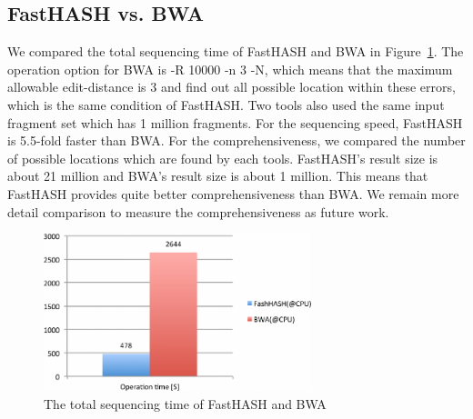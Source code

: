 \subsection{FastHASH vs. BWA}

We compared the total sequencing time of FastHASH and BWA in
Figure~\ref{fig:bwa}. The operation option for BWA is -R 10000 -n 3 -N, which
means that the maximum allowable edit-distance is 3 and find out all possible
location within these errors, which is the same condition of FastHASH. Two
tools also used the same input fragment set which has 1 million fragments. For
the sequencing speed, FastHASH is 5.5-fold faster than BWA. For the
comprehensiveness, we compared the number of possible locations which are found
by each tools. FastHASH's result size is about 21 million and BWA's result size
is about 1 million. This means that FastHASH provides quite better
comprehensiveness than BWA. We remain more detail comparison to measure the
comprehensiveness as future work. \\

\begin{figure}[b] \centering 
\vspace{0.15in}
\includegraphics[height=1.8in]{./figure/BWA_B.pdf} \vspace{0in} \caption{The
total sequencing time of FastHASH and BWA} 
\label{fig:bwa} 
\end{figure}
